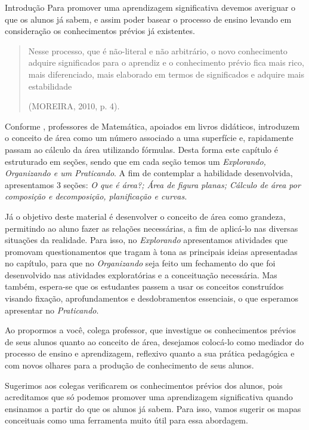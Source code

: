 \begin{apresentacao}{Introdução}
  Para promover uma aprendizagem significativa devemos averiguar o que os alunos já sabem, e assim poder basear o processo de ensino levando em consideração os conhecimentos prévios já existentes.
  \begin{quote}
  Nesse processo, que é não-literal e não arbitrário, o novo conhecimento adquire significados para o aprendiz e o conhecimento prévio fica mais rico, mais diferenciado, mais elaborado em termos de significados e adquire mais estabilidade 

  \flushright
  (MOREIRA, 2010, p. 4).
  \end{quote}

  Conforme \citet{facco2003}, professores de Matemática, apoiados em livros didáticos, introduzem o conceito de área como um número associado a uma superfície e, rapidamente passam ao cálculo da área utilizando fórmulas. Desta forma este capítulo é estruturado em seções, sendo que em cada seção temos um \textit{Explorando, Organizando e um Praticando}. A fim de contemplar a habilidade desenvolvida, apresentamos 3 seções: \textit{O que é área?; Área de figura planas; Cálculo de área por composição e decomposição, planificação e curvas. }

  Já o objetivo deste material é desenvolver o conceito de área como grandeza, permitindo ao aluno fazer as relações necessárias, a fim de aplicá-lo nas diversas situações da realidade. Para isso, no \textit{Explorando} apresentamos atividades que promovam questionamentos que tragam à tona as principais ideias apresentadas no capítulo, para que no \textit{Organizando} seja feito um fechamento do que foi desenvolvido nas atividades exploratórias e a conceituação necessária. Mas também, espera-se que os estudantes passem a usar os conceitos construídos visando fixação, aprofundamentos e desdobramentos essenciais, o que esperamos apresentar no \textit{Praticando}.

  Ao propormos a você, colega professor, que investigue os conhecimentos prévios de seus alunos quanto ao conceito de área, desejamos colocá-lo como mediador do processo de ensino e aprendizagem, reflexivo quanto a sua prática pedagógica e com novos olhares para a produção de conhecimento de seus alunos.

  Sugerimos aos colegas verificarem os conhecimentos prévios dos alunos, pois acreditamos que só podemos promover uma aprendizagem significativa quando ensinamos a partir do que os alunos já sabem. Para isso, vamos sugerir os mapas conceituais como uma ferramenta muito útil para essa abordagem. 


\end{apresentacao}
